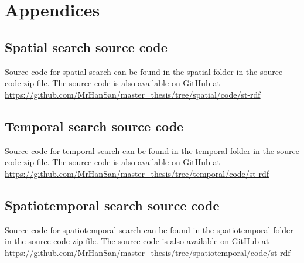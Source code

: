 \appendix

\chapter{Appendices}
\label{cha:appendices}
\section{Spatial search source code}
Source code for spatial search can be found in the spatial folder in the source code zip file. The source code is also available on GitHub at \url{https://github.com/MrHanSan/master_thesis/tree/spatial/code/st-rdf}

\section{Temporal search source code}
Source code for temporal search can be found in the temporal folder in the source code zip file. The source code is also available on GitHub at \url{https://github.com/MrHanSan/master_thesis/tree/temporal/code/st-rdf}

\section{Spatiotemporal search source code}
Source code for spatiotemporal search can be found in the spatiotemporal folder in the source code zip file. The source code is also available on GitHub at \url{https://github.com/MrHanSan/master_thesis/tree/spatiotemporal/code/st-rdf}

